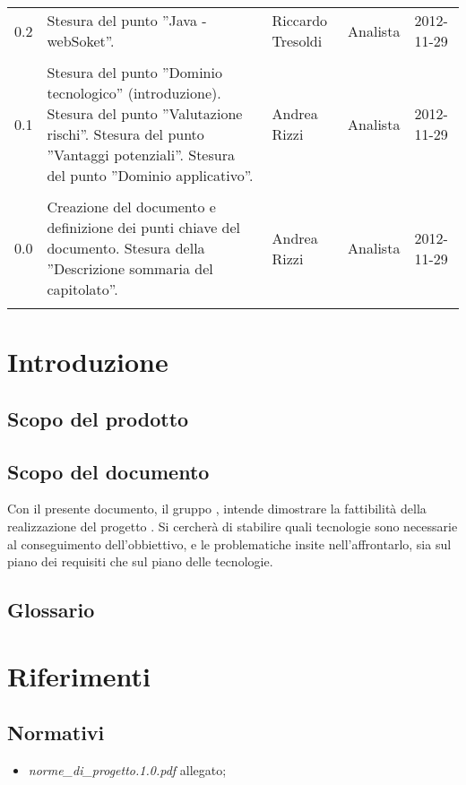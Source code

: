 \begin{longtable}{lp{}lll}
0.2 & Stesura del punto ''Java - webSoket''.  & Riccardo Tresoldi &Analista& 2012-11-29\\\\
0.1 & Stesura del punto ''Dominio tecnologico'' (introduzione). Stesura del punto ''Valutazione rischi''. Stesura del punto ''Vantaggi potenziali''. Stesura del punto ''Dominio applicativo''.  & Andrea Rizzi &Analista& 2012-11-29\\\\
0.0 & Creazione del documento e definizione dei punti chiave del documento. Stesura della ''Descrizione sommaria del capitolato''. & Andrea Rizzi & Analista&2012-11-29\\\\
\bottomrule
\end{longtable}
\newpage



\setcounter{page}{1}
\pagestyle{normal}


\section{Introduzione}
\subsection{Scopo del prodotto}
\purpose
\subsection{Scopo del documento}
Con il presente documento, il gruppo \team{}, intende dimostrare la fattibilità della realizzazione del progetto \caName{}. Si cercherà di stabilire quali tecnologie sono necessarie al conseguimento dell'obbiettivo, e le problematiche insite nell'affrontarlo, sia sul piano dei requisiti che sul piano delle tecnologie.
\subsection{Glossario}
\glossaryIntro
\clearpage

\section{Riferimenti}
\subsection{Normativi}
\begin{itemize}
\item[] \textit{norme\_di\_progetto.1.0.pdf} allegato;
\end{itemize}
